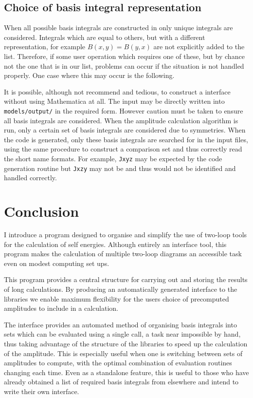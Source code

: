 \subsection{Choice of basis integral representation}

When all possible basis integrals are constructed in \mb only unique integrals are considered.  Integrals which are equal to others, but with a different representation, for example $B(x,y) = B(y,x)$ are not explicitly added to the list.  Therefore, if some user operation which requires one of these, but by chance not the one that is in our list, problems can occur if the situation is not handled properly.  One case where this may occur is the following.

It is possible, although not recommend and tedious, to construct a \tsil interface without using Mathematica at all.  The input may be directly written into \lstinline{models/output/} in the required form.  However caution must be taken to ensure all basis integrals are considered.  When the amplitude calculation algorithm is run, only a certain set of basis integrals are considered due to symmetries.  When the code is generated, only these basis integrals are searched for in the input files, using the same procedure to construct a comparison set and thus correctly read the short name formats.  For example, \lstinline{Jxyz} may be expected by the code generation routine but \lstinline{Jxzy} may not be and thus would not be identified and handled correctly.



\section{Conclusion}

I introduce a program designed to organise and simplify the use of two-loop tools for the calculation of self energies.  Although entirely an interface tool, this program makes the calculation of multiple two-loop diagrams an accessible task even on modest computing set ups.

This program provides a central structure for carrying out and storing the results of long calculations.  By producing an automatically generated interface to the \tsil libraries we enable maximum flexibility for the users choice of precomputed amplitudes to include in a calculation.

The \tsil interface provides an automated method of organising basis integrals into sets which can be evaluated using a single \tsil call, a task near impossible by hand, thus taking advantage of the structure of the \tsil libraries to speed up the calculation of the amplitude.  This is especially useful when one is switching between sets of amplitudes to compute, with the optimal combination of evaluation routines changing each time. Even as a standalone feature, this is useful to those who have already obtained a list of required basis integrals from elsewhere and intend to write their own \tsil interface.




{}


  
